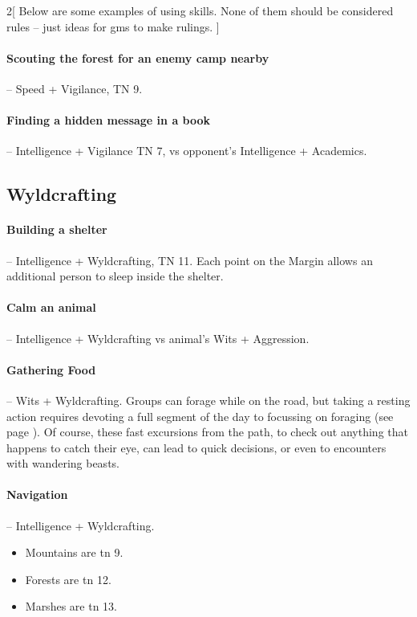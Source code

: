 \begin{multicols}{2}[
  Below are some examples of using skills.
  None of them should be considered rules -- just ideas for \glspl{gm} to make rulings.
]
\paragraph{Scouting the forest for an enemy camp nearby} -- Speed + Vigilance, TN 9.

\paragraph{Finding a hidden message in a book} -- Intelligence + Vigilance TN 7, vs opponent's Intelligence + Academics.

\subsection{Wyldcrafting}

\paragraph{Building a shelter} -- Intelligence + Wyldcrafting, TN 11.
Each point on the Margin allows an additional person to sleep inside the shelter.

\paragraph{Calm an animal} -- Intelligence + Wyldcrafting vs animal's Wits + Aggression.

\paragraph{Gathering Food} -- Wits + Wyldcrafting.
Groups can forage while on the road, but taking a resting action requires devoting a full segment of the day to focussing on foraging (see page \pageref{daytimes}).
Of course, these fast excursions from the path, to check out anything that happens to catch their eye, can lead to quick decisions, or even to encounters with wandering beasts.

\paragraph{Navigation} -- Intelligence + Wyldcrafting.
\label{marching}
\begin{itemize}

  \item
    Mountains are \gls{tn} 9.
  \item
    Forests are \gls{tn} 12.
  \item
    Marshes are \gls{tn} 13.


\end{itemize}
\end{multicols}
